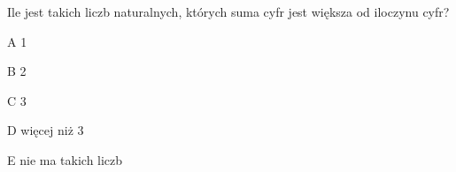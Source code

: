\begin{tresc}
Ile jest takich liczb naturalnych, których suma cyfr jest większa od iloczynu cyfr?
\end{tresc}
\begin{wariant}{A} 1 \end{wariant}
\begin{wariant}{B} 2 \end{wariant}
\begin{wariant}{C} 3 \end{wariant}
\begin{wariant}{D} więcej niż 3 \end{wariant}
\begin{wariant}{E} nie ma takich liczb \end{wariant}
